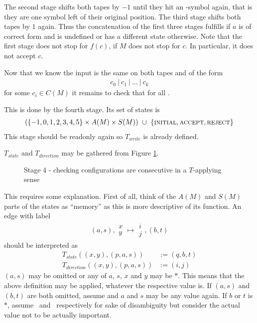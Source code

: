	The second stage shifts both tapes by $-1$ until they hit an \EMP-symbol again, that is they are one symbol left of their original position.
	The third stage shifts both tapes by $1$ again.
	Thus the concatenation of the first three stages fulfills  if $a$ is of correct form and is undefined or has a different state otherwise.
	Note that the first stage does not stop for $f(c)$, if $M$ does not stop for $c$. In particular, it does not accept $c$.

	Now that we know the input is the same on both tapes and of the form
	\begin{align*}
		c_0~|~c_1~|~...~|~c_k
	\end{align*}
	for some $c_i \in C(M)$ it remains to check that  for all .

	This is done by the fourth stage.
	Its set of states is
	\begin{align*}
		(\{-1,0,1,2,3,4,5\} \times A(M) \times S(M))~\cup~\{\text{\scshape{initial}},\text{\scshape{accept}},\text{\scshape{reject}}\}
	\end{align*}
	This stage should be readonly again so $T_{write}$ is already defined.

	$T_{state}$ and $T_{direction}$ may be gathered from Figure \ref{turing_machines:main_theorem:fig_stage4}.

	\begin{figure}
		\centering
		
		\caption{Stage 4 - checking configurations are consecutive in a $T$-applying sense}
		\label{turing_machines:main_theorem:fig_stage4}
	\end{figure}

	This requires some explanation. First of all, think of the $A(M)$ and $S(M)$ parts of the states as ``memory'' as this is more descriptive of its function.
	An edge  with label
	\begin{align*}
		(a,s),\begin{matrix} x \\ y \end{matrix} \mapsto \begin{matrix} i \\ j \end{matrix}, (b,t)
	\end{align*}
	should be interpreted as
	\begin{align*}
		T_{state}((x,y),(p,a,s)) &:= (q,b,t) \\
		T_{direction}((x,y),(p,a,s)) &:= (i,j)
	\end{align*}
	$(a,s)$ may be omitted or any of $a$, $s$, $x$ and $y$ may be $*$. This means that the above definition may be applied, whatever the respective value is.
	If $(a,s)$ and $(b,t)$ are both omitted, assume  and $a$ and $s$ may be any value again.
	If $b$ or $t$ is $*$, assume ~and ~respectively for sake of disambiguity but consider the actual value not to be actually important.

\endproof
